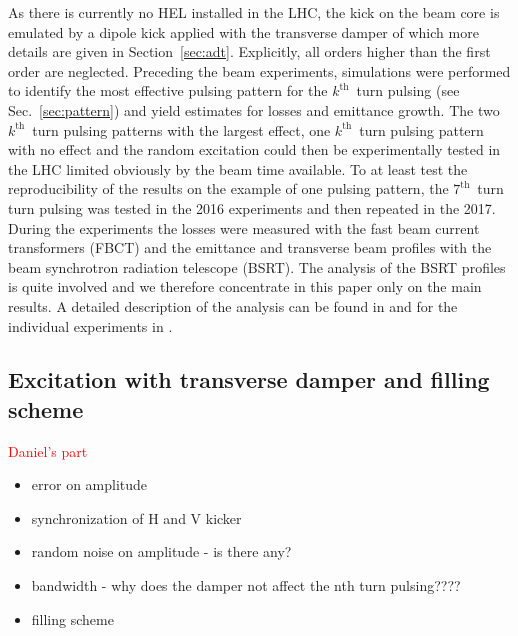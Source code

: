 \documentclass[%
 reprint,
 amsmath,amssymb,
 aps,
prstab,
]{revtex4-1}
\begin{document}
As there is currently no HEL installed in the LHC, the kick on the beam core is emulated by a dipole kick applied with the transverse damper of which more details are given in Section~\ref{sec:adt}. Explicitly, all orders higher than the first order are neglected. Preceding the beam experiments, simulations were performed to identify the most effective pulsing pattern for the $k^{\mathrm{th}}$~turn pulsing (see Sec.~\ref{sec:pattern}) and yield estimates for losses and emittance growth. The two $k^{\mathrm{th}}$~turn pulsing patterns with the largest effect, one $k^{\mathrm{th}}$~turn pulsing pattern with no effect and the random excitation could then be experimentally tested in the LHC limited obviously by the beam time available. To at least test the reproducibility of the results on the example of one pulsing pattern, the $7^{\mathrm{th}}$~turn turn pulsing was tested in the 2016 experiments and then repeated in the 2017. During the experiments the losses were measured with the fast beam current transformers (FBCT) and the emittance and transverse beam profiles with the beam synchrotron radiation telescope (BSRT). The analysis of the BSRT profiles is quite involved and we therefore concentrate in this paper only on the main results. A detailed description of the analysis can be found in \cite{bsrtprofinj} and for the individual experiments in \cite{resexmd2016,resexmd2017}.

\subsection{Excitation with transverse damper and filling scheme\label{sec:adt}}
\textcolor{red}{Daniel's part}
\begin{itemize}
	\item error on amplitude
	\item synchronization of H and V kicker
	\item random noise on amplitude - is there any?
	\item bandwidth - why does the damper not affect the nth turn pulsing????
	\item filling scheme
\end{itemize}
\end{document}
